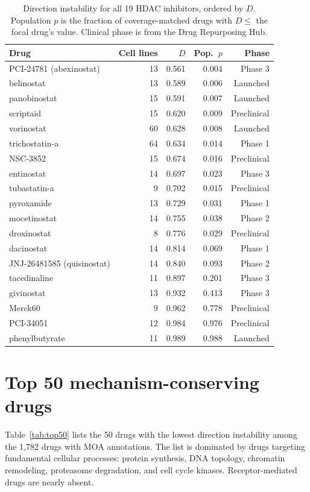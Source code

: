 \documentclass[11pt]{article}
\begin{document}
\begin{table}[h]
\centering
\caption{Direction instability for all 19 HDAC inhibitors, ordered by $D$.
Population $p$ is the fraction of coverage-matched drugs with $D \leq$ the
focal drug's value. Clinical phase is from the Drug Repurposing Hub.}
\label{tab:hdac_full}
\small
\begin{tabular}{lrrrr}
\toprule
Drug & Cell lines & $D$ & Pop.\ $p$ & Phase \\
\midrule
PCI-24781 (abexinostat) & 13 & 0.561 & 0.004 & Phase 3 \\
belinostat & 13 & 0.589 & 0.006 & Launched \\
panobinostat & 15 & 0.591 & 0.007 & Launched \\
scriptaid & 15 & 0.620 & 0.009 & Preclinical \\
vorinostat & 60 & 0.628 & 0.008 & Launched \\
trichostatin-a & 64 & 0.634 & 0.014 & Phase 1 \\
NSC-3852 & 15 & 0.674 & 0.016 & Preclinical \\
entinostat & 14 & 0.697 & 0.023 & Phase 3 \\
tubastatin-a & 9 & 0.702 & 0.015 & Preclinical \\
pyroxamide & 13 & 0.729 & 0.031 & Phase 1 \\
mocetinostat & 14 & 0.755 & 0.038 & Phase 2 \\
droxinostat & 8 & 0.776 & 0.029 & Preclinical \\
dacinostat & 14 & 0.814 & 0.069 & Phase 1 \\
JNJ-26481585 (quisinostat) & 14 & 0.840 & 0.093 & Phase 2 \\
tacedinaline & 11 & 0.897 & 0.201 & Phase 3 \\
givinostat & 13 & 0.932 & 0.413 & Phase 3 \\
Merck60 & 9 & 0.962 & 0.778 & Preclinical \\
PCI-34051 & 12 & 0.984 & 0.976 & Preclinical \\
phenylbutyrate & 11 & 0.989 & 0.988 & Launched \\
\bottomrule
\end{tabular}
\end{table}

\section{Top 50 mechanism-conserving drugs}
\label{app:top50}

Table~\ref{tab:top50} lists the 50 drugs with the lowest direction
instability among the 1{,}782 drugs with MOA annotations. The list is
dominated by drugs targeting fundamental cellular processes: protein
synthesis, DNA topology, chromatin remodeling, proteasome degradation, and
cell cycle kinases. Receptor-mediated drugs are nearly absent.
\end{document}
